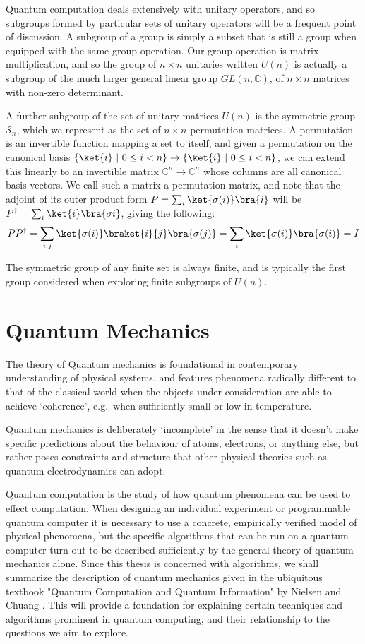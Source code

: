 Quantum computation deals extensively with unitary operators, and so subgroups formed by particular sets of unitary operators will be a frequent point of discussion. A subgroup of a group is simply a subset that is still a group when equipped with the same group operation. Our group operation is matrix multiplication, and so the group of $n \times n$ unitaries written $U(n)$ is actually a subgroup of the much larger general linear group $GL(n, \mathbb{C})$, of $n \times n$ matrices with non-zero determinant.

A further subgroup of the set of unitary matrices $U(n)$ is the symmetric group $\mathcal{S}_n$, which we represent as the set of $n \times n$ permutation matrices. A permutation is an invertible function mapping a set to itself, and given a permutation on the canonical basis $\{\ket{i}\ |\ 0 \leq i < n\} \to \{\ket{i}\ |\ 0 \leq i < n\}$, we can extend this linearly to an invertible matrix $\mathbb{C}^n \to \mathbb{C}^n$ whose columns are all canonical basis vectors. We call such a matrix a permutation matrix, and note that the adjoint of its outer product form $P = \sum_i \ket{\sigma(i)}\bra{i}$ will be $P^{\dagger} = \sum_i \ket{i}\bra{\sigma{i}}$, giving the following:
\begin{align*}
	PP^\dagger = \sum_{i,j} \ket{\sigma(i)}\braket{i}{j}\bra{\sigma(j)} = \sum_i \ket{\sigma(i)}\bra{\sigma(i)} = I
\end{align*}

The symmetric group of any finite set is always finite, and is typically the first group considered when exploring finite subgroups of $U(n)$.

\section{Quantum Mechanics}

The theory of Quantum mechanics is foundational in contemporary understanding of physical systems, and features phenomena radically different to that of the classical world when the objects under consideration are able to achieve `coherence', e.g.\ when sufficiently small or low in temperature.

Quantum mechanics is deliberately `incomplete' in the sense that it doesn't make specific predictions about the behaviour of atoms, electrons, or anything else, but rather poses constraints and structure that other physical theories such as quantum electrodynamics can adopt.

Quantum computation is the study of how quantum phenomena can be used to effect computation. When designing an individual experiment or programmable quantum computer it is necessary to use a concrete, empirically verified model of physical phenomena, but the specific algorithms that can be run on a quantum computer turn out to be described sufficiently by the general theory of quantum mechanics alone. Since this thesis is concerned with algorithms, we shall summarize the description of quantum mechanics given in the ubiquitous textbook "Quantum Computation and Quantum Information" by Nielsen and Chuang \cite{textbook}. This will provide a foundation for explaining certain techniques and algorithms prominent in quantum computing, and their relationship to the questions we aim to explore.
